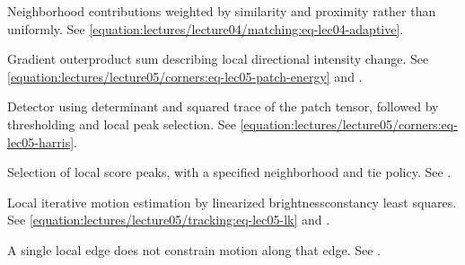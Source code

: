 \documentclass[letterpaper,11pt,english,openany,oneside]{jupyterBook}
\begin{document}
\begin{description}
\sphinxAtStartPar
Neighborhood contributions weighted by similarity and proximity rather than uniformly. See \eqref{equation:lectures/lecture04/matching:eq-lec04-adaptive}.

\end{description}
\begin{description}
\sphinxAtStartPar
Gradient outer\sphinxhyphen{}product sum describing local directional intensity change. See \eqref{equation:lectures/lecture05/corners:eq-lec05-patch-energy} and {\hyperref[\detokenize{lectures/lecture05/corners:lec05-corners}]{}}.

\sphinxAtStartPar
Detector using determinant and squared trace of the patch tensor, followed by thresholding and local peak selection. See \eqref{equation:lectures/lecture05/corners:eq-lec05-harris}.

\sphinxAtStartPar
Selection of local score peaks, with a specified neighborhood and tie policy. See {\hyperref[\detokenize{lectures/lecture05/corners:ex-lec05-nms}]{}}.

\sphinxAtStartPar
Local iterative motion estimation by linearized brightness\sphinxhyphen{}constancy least squares. See \eqref{equation:lectures/lecture05/tracking:eq-lec05-lk} and {\hyperref[\detokenize{lectures/lecture05/tracking:lec05-tracking}]{}}.

\sphinxAtStartPar
A single local edge does not constrain motion along that edge. See {\hyperref[\detokenize{lectures/lecture05/tracking:lec05-tracking}]{}}.


\end{description}
\end{document}

